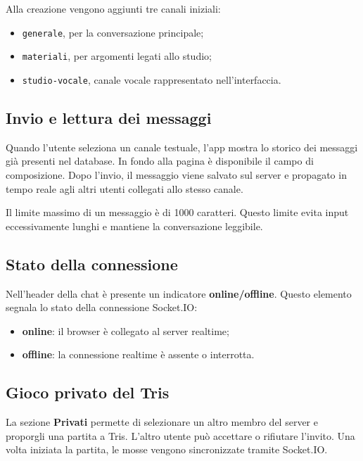 \documentclass[11pt,a4paper]{article}
\begin{document}
Alla creazione vengono aggiunti tre canali iniziali:

\begin{itemize}
  \item \texttt{generale}, per la conversazione principale;
  \item \texttt{materiali}, per argomenti legati allo studio;
  \item \texttt{studio-vocale}, canale vocale rappresentato nell'interfaccia.
\end{itemize}

\subsection{Invio e lettura dei messaggi}

Quando l'utente seleziona un canale testuale, l'app mostra lo storico dei messaggi già presenti nel database. In fondo alla pagina è disponibile il campo di composizione. Dopo l'invio, il messaggio viene salvato sul server e propagato in tempo reale agli altri utenti collegati allo stesso canale.

Il limite massimo di un messaggio è di 1000 caratteri. Questo limite evita input eccessivamente lunghi e mantiene la conversazione leggibile.

\subsection{Stato della connessione}

Nell'header della chat è presente un indicatore \textbf{online/offline}. Questo elemento segnala lo stato della connessione Socket.IO:

\begin{itemize}
  \item \textbf{online}: il browser è collegato al server realtime;
  \item \textbf{offline}: la connessione realtime è assente o interrotta.
\end{itemize}

\subsection{Gioco privato del Tris}

La sezione \textbf{Privati} permette di selezionare un altro membro del server e proporgli una partita a Tris. L'altro utente può accettare o rifiutare l'invito. Una volta iniziata la partita, le mosse vengono sincronizzate tramite Socket.IO.
\end{document}
